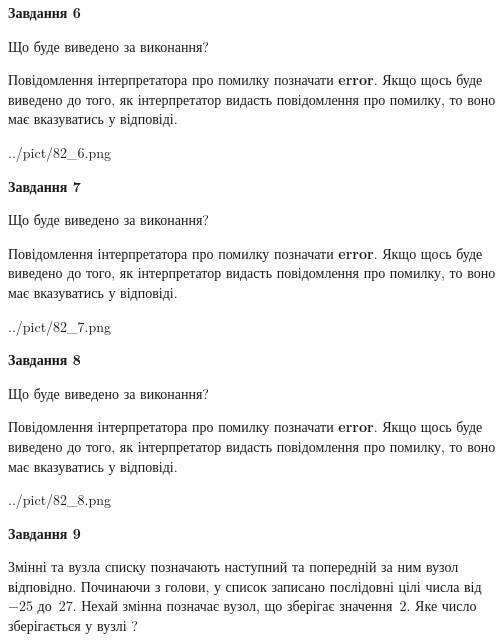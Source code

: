 \documentclass[12pt, ukrainian]{article}
\begin{document}
{\begin {large}
{\begin {center}\textbf{Завдання 6}\end {center}}\par
Що буде виведено за виконання?

Повідомлення інтерпретатора про помилку позначати \textbf{error}.
Якщо щось буде виведено до того, як інтерпретатор видасть повідомлення про помилку, 
то воно має вказуватись у відповіді. \par


\begin{center}
	{../pict/82_6.png}
\end{center}
\newpage

{\begin {center}\textbf{Завдання 7}\end {center}}\par
Що буде виведено за виконання?

Повідомлення інтерпретатора про помилку позначати \textbf{error}.
Якщо щось буде виведено до того, як інтерпретатор видасть повідомлення про помилку, 
то воно має вказуватись у відповіді. \par


\begin{center}
	{../pict/82_7.png}
\end{center}
\newpage

{\begin {center}\textbf{Завдання 8}\end {center}}\par
Що буде виведено за виконання?

Повідомлення інтерпретатора про помилку позначати \textbf{error}.
Якщо щось буде виведено до того, як інтерпретатор видасть повідомлення про помилку, 
то воно має вказуватись у відповіді. \par


\begin{center}
	{../pict/82_8.png}
\end{center}
\newpage

{\begin {center}\textbf{Завдання 9}\end {center}}\par
Змінні  та  вузла списку позначають наступний та попередній за ним вузол відповідно. Починаючи з голови, у список записано послідовні цілі числа від~$-25$ до~$27$. Нехай змінна  позначає вузол, що зберігає значення~$2$.
Яке число зберігається у вузлі  ?\par
\newpage


\end{large}}
\end{document}
